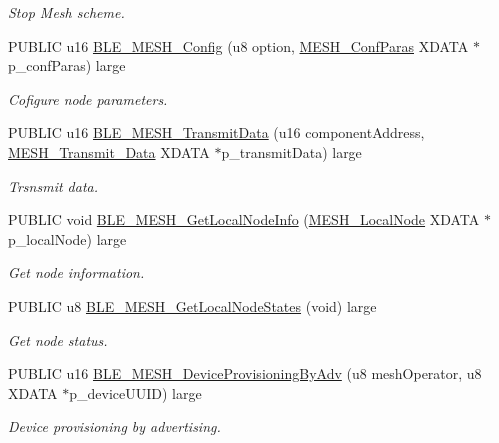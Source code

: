 \begin{DoxyCompactItemize}
\begin{DoxyCompactList}\small\item\em Stop Mesh scheme. \end{DoxyCompactList}\item 
P\+U\+B\+L\+IC u16 \hyperlink{group___m_e_s_h_gaf278aaac14b896993d1a05079427a4d5}{B\+L\+E\+\_\+\+M\+E\+S\+H\+\_\+\+Config} (u8 option, \hyperlink{union_m_e_s_h___conf_paras}{M\+E\+S\+H\+\_\+\+Conf\+Paras} X\+D\+A\+TA $\ast$p\+\_\+conf\+Paras) large
\begin{DoxyCompactList}\small\item\em Cofigure node parameters. \end{DoxyCompactList}\item 
P\+U\+B\+L\+IC u16 \hyperlink{group___m_e_s_h_ga029b8285c958214732fdf1134e44abf6}{B\+L\+E\+\_\+\+M\+E\+S\+H\+\_\+\+Transmit\+Data} (u16 component\+Address, \hyperlink{struct_m_e_s_h___transmit___data}{M\+E\+S\+H\+\_\+\+Transmit\+\_\+\+Data} X\+D\+A\+TA $\ast$p\+\_\+transmit\+Data) large
\begin{DoxyCompactList}\small\item\em Trsnsmit data. \end{DoxyCompactList}\item 
P\+U\+B\+L\+IC void \hyperlink{group___m_e_s_h_ga2278ffb735e0b5573ecd1f4c2389c8a6}{B\+L\+E\+\_\+\+M\+E\+S\+H\+\_\+\+Get\+Local\+Node\+Info} (\hyperlink{struct_m_e_s_h___local_node}{M\+E\+S\+H\+\_\+\+Local\+Node} X\+D\+A\+TA $\ast$p\+\_\+local\+Node) large
\begin{DoxyCompactList}\small\item\em Get node information. \end{DoxyCompactList}\item 
P\+U\+B\+L\+IC u8 \hyperlink{group___m_e_s_h_ga688c1b66fe80d21701256883f49a1b3e}{B\+L\+E\+\_\+\+M\+E\+S\+H\+\_\+\+Get\+Local\+Node\+States} (void) large
\begin{DoxyCompactList}\small\item\em Get node status. \end{DoxyCompactList}\item 
P\+U\+B\+L\+IC u16 \hyperlink{group___m_e_s_h_gae5cd935db83243a92388ef0af806b5ff}{B\+L\+E\+\_\+\+M\+E\+S\+H\+\_\+\+Device\+Provisioning\+By\+Adv} (u8 mesh\+Operator, u8 X\+D\+A\+TA $\ast$p\+\_\+device\+U\+U\+ID) large
\begin{DoxyCompactList}\small\item\em Device provisioning by advertising. \end{DoxyCompactList}\item 

\end{DoxyCompactItemize}
